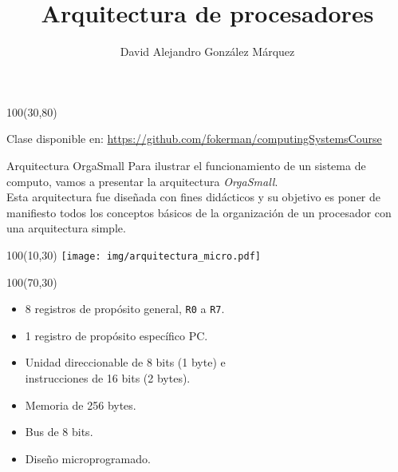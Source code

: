 \documentclass[aspectratio=169]{beamer}
\title{\Huge Arquitectura de procesadores}
\author{David Alejandro González Márquez}
\date{}
\begin{document}
\begin{frame}[plain]
    \titlepage
    \begin{textblock}{100}(30,80)
    \begin{tcolorbox}[size=small,width=\textwidth,colback={gray!30},title={}]
    \begin{center}
     \scriptsize Clase disponible en: \url{https://github.com/fokerman/computingSystemsCourse}
    \end{center}
    \end{tcolorbox}
    \end{textblock}
\end{frame}

\begin{frame}[fragile,t]{Arquitectura OrgaSmall}
    \small
    Para ilustrar el funcionamiento de un sistema de computo, vamos a presentar la arquitectura \emph{OrgaSmall}.\\
    \vspace{0.2cm}
    Esta arquitectura fue diseñada con fines didácticos y su objetivo es poner de manifiesto todos los conceptos básicos de la organización de un procesador con una arquitectura simple.\\
    \bigskip    
    \begin{textblock}{100}(10,30)
    \texttt{[image: img/arquitectura\_micro.pdf]}
    \end{textblock}
    \begin{textblock}{100}(70,30)
    \begin{itemize}
    \item 8 registros de propósito general, \texttt{R0} a \texttt{R7}.
    \item 1 registro de propósito específico PC.
    \item Unidad direccionable de 8 bits (1 byte) e \\ instrucciones de 16 bits (2 bytes).
    \item Memoria de 256 bytes.
    \item Bus de 8 bits.
    \item Diseño microprogramado.
    \end{itemize}
    \end{textblock}
\end{frame}
\end{document}
